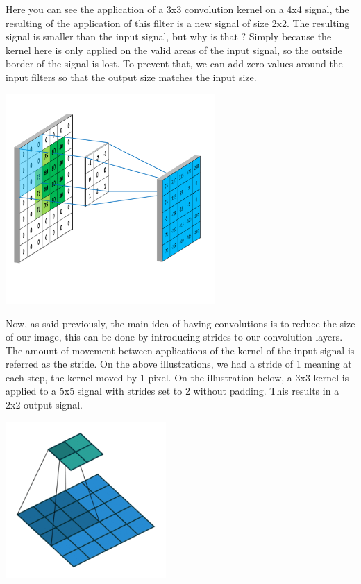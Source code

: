 \documentclass[12pt]{article}
\begin{document}
Here you can see the application of a 3x3 convolution kernel on a 4x4 signal, the resulting of the application of this filter is a new signal of size 2x2. The resulting signal is smaller than the input signal, but why is that ? Simply because the kernel here is only applied on the valid areas of the input signal, so the outside border of the signal is lost. To prevent that, we can add zero values around the input filters so that the output size matches the input size. \\
\centerline{\includegraphics[height=8cm]{../../docs/padding.png}}

Now, as said previously, the main idea of having convolutions is to reduce the size of our image, this can be done by introducing strides to our convolution layers. The amount of movement between applications of the kernel of the input signal is referred as the stride. On the above illustrations, we had a stride of 1 meaning at each step, the kernel moved by 1 pixel. On the illustration below, a 3x3 kernel is applied to a 5x5 signal with strides set to 2 without padding. This results in a 2x2 output signal. \\
\centerline{\includegraphics[height=6cm]{../../docs/strides.png}}
\end{document}
